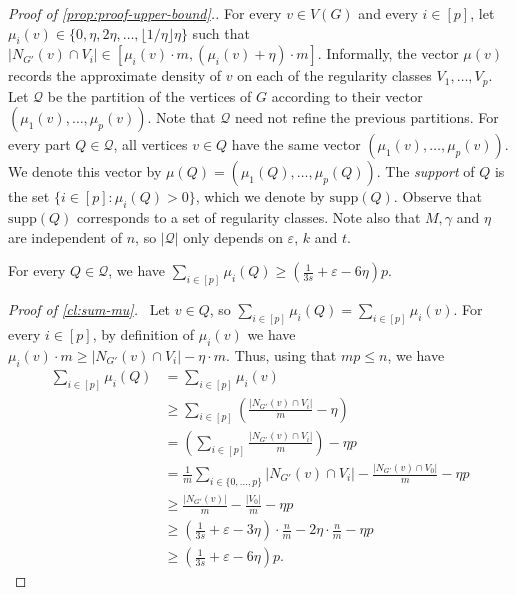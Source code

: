 \documentclass{article}
\newcommand{\supp}{\text{supp}}
\newcommand{\mydiamond}{\rotatebox[origin=c]{45}{$\vcenter{\hbox{$\Box$}}$}}
\newenvironment{subproof}[1]{\par\noindent \textit{Proof of #1.}\ }{\hfill \mydiamond \par\vspace{11pt}}
\begin{document}
\begin{proof}[Proof of \cref{prop:proof-upper-bound}.]
    For every $v \in V(G)$ and every $i \in [p]$, let $\mu_i(v) \in \{0, \eta, 2\eta, \ldots, \lfloor1/\eta\rfloor\eta\}$ such that $|N_{G'}(v) \cap V_i| \in [\mu_i(v) \cdot m, (\mu_i(v) + \eta) \cdot m]$.
    Informally, the vector $\mu(v)$ records the approximate density of $v$ on each of the regularity classes $V_1, \ldots, V_p$. 
    Let $\mathcal{Q}$ be the partition of the vertices of $G$ according to their vector $(\mu_1(v), \ldots, \mu_p(v))$.
    Note that $\mathcal{Q}$ need not refine the previous partitions.
    For every part $Q \in \mathcal{Q}$, all vertices $v \in Q$ have the same vector $(\mu_1(v), \ldots, \mu_p(v))$. We denote this vector by $\mu(Q) = (\mu_1(Q), \ldots, \mu_p(Q))$.
    The \emph{support} of $Q$ is the set $\{i \in [p] : \mu_i(Q) > 0\}$, which we denote by $\supp(Q)$.
    Observe that $\supp(Q)$ corresponds to a set of regularity classes.
    Note also that $M, \gamma$ and $\eta$ are independent of $n$, so $|\mathcal{Q}|$ only depends on $\varepsilon$, $k$ and $t$.

    \begin{claim}\label{cl:sum-mu}
        For every $Q \in \mathcal{Q}$, we have $\sum_{i \in [p]} \mu_i(Q) \geq \left(\frac{1}{3s}+\varepsilon-6\eta\right)p$.
    \end{claim}

    \begin{subproof}{\cref{cl:sum-mu}}
        Let $v \in Q$, so $\sum_{i \in [p]} \mu_i(Q) = \sum_{i \in [p]} \mu_i(v)$.
        For every $i \in [p]$, by definition of $\mu_i(v)$ we have $\mu_i(v) \cdot m \geq |N_{G'}(v) \cap V_i| - \eta \cdot m$.
        Thus, using that $mp \leq n$, we have \begin{align*}
            \sum_{i \in [p]} \mu_i(Q) &= \sum_{i \in [p]} \mu_i(v) \\
                &\geq \sum_{i \in [p]} \left(\frac{|N_{G'}(v) \cap V_i|}{m} - \eta\right) \\
                &= \left(\sum_{i \in [p]} \frac{|N_{G'}(v) \cap V_i|}{m}\right) - \eta p \\
                &= \frac{1}{m} \sum_{i \in \{0, \ldots, p\}} |N_{G'}(v) \cap V_i| - \frac{|N_{G'}(v) \cap V_0|}{m} - \eta p \\
                &\geq \frac{|N_{G'}(v)|}{m} - \frac{|V_0|}{m} - \eta p \\
                &\geq \left(\frac{1}{3s}+\varepsilon-3\eta\right) \cdot \frac{n}{m} - 2\eta\cdot\frac{n}{m} - \eta p \\
                &\geq \left(\frac{1}{3s} + \varepsilon - 6\eta\right)p. 
        \end{align*}
    \end{subproof}


\end{proof}
\end{document}
